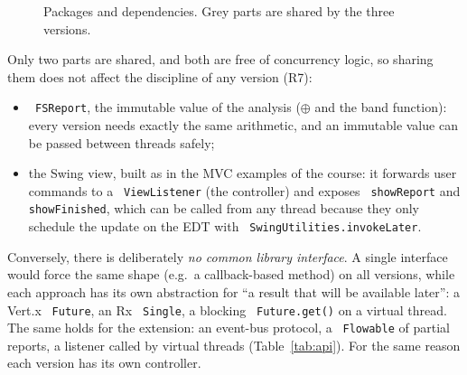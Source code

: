 \documentclass[11pt,a4paper]{article}
\newcommand{\code}[1]{\texttt{\hyphenchar\font=-1 #1}}
\begin{document}
\begin{figure}[H]
\centering
{}
\caption{Packages and dependencies. Grey parts are shared by the three versions.}\label{fig:arch}
\end{figure}

Only two parts are shared, and both are free of concurrency logic, so sharing them does not affect the
discipline of any version (R7):
\begin{itemize}
  \item \code{FSReport}, the immutable value of the analysis ($\oplus$ and the band function): every
        version needs exactly the same arithmetic, and an immutable value can be passed between threads
        safely;
  \item the Swing view, built as in the MVC examples of the course: it forwards user commands to a
        \code{ViewListener} (the controller) and exposes \code{showReport} and \code{showFinished},
        which can be called from any thread because they only schedule the update on the EDT with
        \code{SwingUtilities.invokeLater}.
\end{itemize}
Conversely, there is deliberately \emph{no common library interface}. A single interface would force
the same shape (e.g.\ a callback-based method) on all versions, while each approach has its own
abstraction for ``a result that will be available later'': a Vert.x \code{Future}, an Rx \code{Single},
a blocking \code{Future.get()} on a virtual thread. The same holds for the extension: an event-bus
protocol, a \code{Flowable} of partial reports, a listener called by virtual threads
(Table~\ref{tab:api}). For the same reason each version has its own controller.
\end{document}
